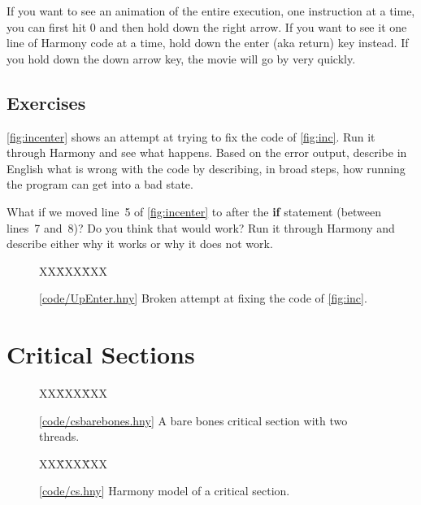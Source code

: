 \documentclass{report}
\newcommand{\harmonysource}[1]{
\begin{tabbing}
XX\=XXX\=XXX\kill
    
\end{tabbing}
}
\newcommand{\harmonylink}[1]{%
[\href{https://harmony.cs.cornell.edu/#1}{\underline{#1}}]%
}
\newenvironment{code}{
\tcolorbox
}{
\endtcolorbox
}
\begin{document}
If you want to see an animation of the entire execution, one instruction
at a time, you can first hit 0 and then hold down the right arrow.
If you want to see it one line of Harmony code at a time, hold down the
enter (aka return) key instead.
If you hold down the down arrow key, the movie will
go by very quickly.

\section*{Exercises}

\begin{problems}
\item \autoref{fig:incenter} shows an attempt at trying to fix the code of
    \autoref{fig:inc}.  Run it through Harmony and see what happens.  Based on
    the error output, describe in English what is wrong with the code by describing,
    in broad steps, how running the program can get into a bad state.
\item What if we moved line~5 of \autoref{fig:incenter} to after the \textbf{if}
    statement (between lines~7 and~8)?  Do you think that would work?  Run it through
    Harmony and describe either why it works or why it does not work.
\end{problems}

\begin{figure}
\begin{code}
\harmonysource{UpEnter}
\end{code}
\caption{\harmonylink{code/UpEnter.hny} Broken attempt at fixing the code of \autoref{fig:inc}.}
\label{fig:incenter}
\end{figure}

\chapter{Critical Sections}
\label{ch:critical}

\begin{figure}
\begin{code}
\harmonysource{csbarebones}
\end{code}
\caption{\harmonylink{code/csbarebones.hny} A bare bones critical section with two threads.}
\label{fig:csbarebones}
\end{figure}

\begin{figure}
\begin{code}
\harmonysource{cs}
\end{code}
\caption{\harmonylink{code/cs.hny} Harmony model of a critical section.}
\label{fig:cs}
\end{figure}
\end{document}
